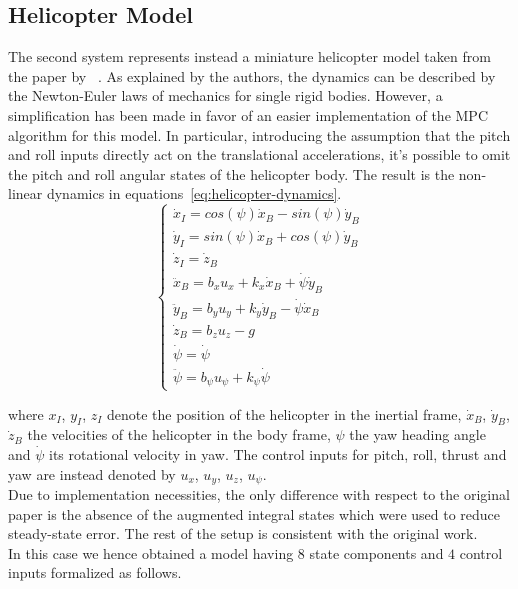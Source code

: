 \documentclass[../main.tex]{subfiles}
\begin{document}
\subsection{Helicopter Model}

The second system represents instead a miniature helicopter model taken from the
paper by ~\cite{helicopter}. As explained by the
authors, the dynamics can be described by the Newton-Euler laws of mechanics for
single rigid bodies. However, a simplification has been made in favor of an
easier implementation of the MPC algorithm for this model. In particular,
introducing the assumption that the pitch and roll inputs directly act on the
translational accelerations, it's possible to omit the pitch and roll angular
states of the helicopter body. The result is the non-linear dynamics in
equations~\eqref{eq:helicopter-dynamics}.
\begin{equation}\label{eq:helicopter-dynamics}
	\begin{cases}
		\dot{x}_I = cos(\psi) \dot{x}_B - sin(\psi) \dot{y}_B\\
		\dot{y}_I = sin(\psi) \dot{x}_B + cos(\psi) \dot{y}_B\\
		\dot{z}_I = \dot{z}_B\\
		\ddot{x}_B = b_x u_x + k_x \dot{x}_B + \dot{\psi} \dot{y}_B\\
		\ddot{y}_B = b_y u_y + k_y \dot{y}_B - \dot{\psi} \dot{x}_B\\
		\dot{z}_B = b_z u_z - g\\
		\dot{\psi} = \dot{\psi}\\
		\ddot{\psi} = b_{\psi} u_{\psi} + k_{\psi} \dot{\psi}
	\end{cases}
\end{equation}

where $x_I$, $y_I$, $z_I$ denote the position of the helicopter in the
inertial frame, $\dot{x}_B$, $\dot{y}_B$, $\dot{z}_B$ the velocities of the
helicopter in the body frame, $\psi$ the yaw heading angle and $\dot{\psi}$ its
rotational velocity in yaw. The control inputs for pitch, roll, thrust and yaw
are instead denoted by $u_x$, $u_y$, $u_z$, $u_{\psi}$.\\
Due to implementation necessities, the only difference with respect to the
original paper is the absence of the augmented integral states which were used
to reduce steady-state error. The rest of the setup is consistent with the
original work.\\
In this case we hence obtained a model having $8$ state components and $4$
control inputs formalized as follows.
\end{document}
